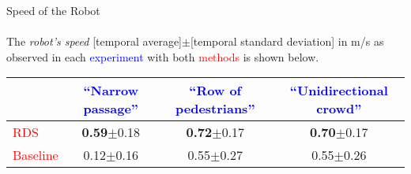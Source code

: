 \documentclass{article}
\begin{document}
{\centering\Large Speed of the Robot\\}~\\
The {\it robot's speed} [temporal average]$\pm$[temporal standard deviation] in m/s as observed in each \textcolor{blue}{experiment} with both \textcolor{red}{methods} is shown below.
\begin{table}[h]
	\centering
	\begin{tabular}{|l|c|c|c|}
		\hline
		  & \textcolor{blue}{``Narrow passage''}              & \textcolor{blue}{``Row of pedestrians''} & \textcolor{blue}{``Unidirectional crowd''}\\
		\hline
		\textcolor{red}{RDS}      & \textbf{0.59}$\pm$0.18 & \textbf{0.72}$\pm$0.17 & \textbf{0.70}$\pm$0.17\\
		\hline
		\textcolor{red}{Baseline} & 0.12$\pm$0.16          & 0.55$\pm$0.27          & 0.55$\pm$0.26         \\
		\hline
	\end{tabular}
\end{table}
\end{document}
